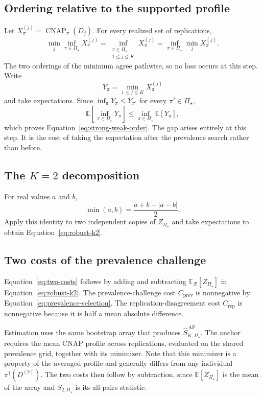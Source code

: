 \documentclass[11pt]{article}
\newcommand{\CNAP}{\operatorname{CNAP}}
\newcommand{\Regime}{\mathcal{R}}
\newcommand{\PSet}{\Pi_\star}
\newcommand{\E}{\mathbb{E}}
\newcommand{\SRobHat}{\widehat S_{K,\PSet}^{\,\mathrm{AP}}}
\theoremstyle{remark}
\begin{document}
\subsection{Ordering relative to the supported profile}

Let $X_\pi^{(j)}=\CNAP_\pi(D_j)$. For every realized set of replications,
\[
\min_j\inf_{\pi\in\PSet}X_\pi^{(j)}
=
\inf_{\substack{\pi\in\PSet\\1\leq j\leq K}}
X_\pi^{(j)}
=
\inf_{\pi\in\PSet}\min_jX_\pi^{(j)}.
\]
The two orderings of the minimum agree pathwise, so no loss occurs at this step. Write
\[
Y_\pi=\min_{1\leq j\leq K}X_\pi^{(j)}
\]
and take expectations. Since $\inf_\pi Y_\pi\leq Y_{\pi'}$ for every $\pi'\in\PSet$,
\[
\E\left[\inf_{\pi\in\PSet}Y_\pi\right]
\leq
\inf_{\pi\in\PSet}\E[Y_\pi],
\]
which proves Equation~\eqref{eq:strong-weak-order}. The gap arises entirely at this step. It is the cost of taking the expectation after the prevalence search rather than before.

\subsection{The $K=2$ decomposition}

For real values $a$ and $b$,
\[
\min(a,b)
=
\frac{a+b-|a-b|}{2}.
\]
Apply this identity to two independent copies of $Z_{\PSet}$ and take expectations to obtain Equation~\eqref{eq:robust-k2}.

\subsection{Two costs of the prevalence challenge}
\label{app:penalty}

Equation~\eqref{eq:two-costs} follows by adding and subtracting $\E_{\Regime}[Z_{\PSet}]$ in Equation~\eqref{eq:robust-k2}. The prevalence-challenge cost $C_{\mathrm{prev}}$ is nonnegative by Equation~\eqref{eq:prevalence-selection}. The replication-disagreement cost $C_{\mathrm{rep}}$ is nonnegative because it is half a mean absolute difference.

Estimation uses the same bootstrap array that produces $\SRobHat$. The anchor requires the mean CNAP profile across replications, evaluated on the shared prevalence grid, together with its minimizer. Note that this minimizer is a property of the averaged profile and generally differs from any individual $\pi^\dagger(D^{(b)})$. The two costs then follow by subtraction, since $\E[Z_{\PSet}]$ is the mean of the array and $S_{2,\PSet}$ is its all-pairs statistic.
\end{document}

